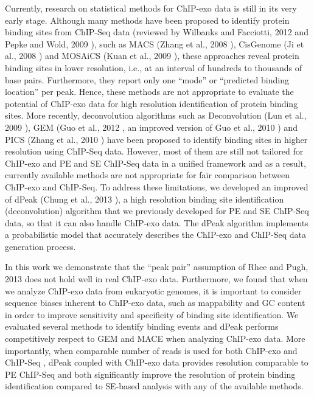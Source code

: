 \documentclass{bmcart}\usepackage[]{graphicx}\usepackage[]{color}
\begin{document}
Currently, research on statistical methods for ChIP-exo data is still
in its very early stage. Although many methods have been proposed to
identify protein binding sites from ChIP-Seq data (reviewed by
Wilbanks and Facciotti, 2012 \cite{evaluation} and Pepke and Wold,
2009 \cite{computation}), such as MACS (Zhang et al., 2008
\cite{macs}), CisGenome (Ji et al., 2008 \cite{cisgenome}) and MOSAiCS
(Kuan et al., 2009 \cite{mosaics}), these approaches reveal protein
binding sites in lower resolution, i.e., at an interval of hundreds to
thousands of base pairs. Furthermore, they report only one ``mode'' or
``predicted binding location'' per peak. Hence, these methods are not
appropriate to evaluate the potential of ChIP-exo data for high
resolution identification of protein binding sites. More recently,
deconvolution algorithms such as Deconvolution (Lun et al., 2009
\cite{csdeconv}), GEM (Guo et al., 2012 \cite{gem}, an improved
version of Guo et al., 2010 \cite{gps} ) and PICS (Zhang et al., 2010
\cite{pics}) have been proposed to identify binding sites in higher
resolution using ChIP-Seq data. However, most of them are still not
tailored for ChIP-exo and PE and SE ChIP-Seq data in a unified
framework and as a result, currently available methods are not
appropriate for fair comparison between ChIP-exo and ChIP-Seq. To
address these limitations, we developed an improved of dPeak (Chung et
al., 2013 \cite{dpeak}), a high resolution binding site identification
(deconvolution) algorithm that we previously developed for PE and SE
ChIP-Seq data, so that it can also handle ChIP-exo data. The dPeak
algorithm implements a probabilistic model that accurately describes
the ChIP-exo and ChIP-Seq data generation process.

In this work we demonstrate that the ``peak pair'' assumption of Rhee
and Pugh, 2013 \cite{exo2} does not hold well in real ChIP-exo
data. Furthermore, we found that when we analyze ChIP-exo data from
eukaryotic genomes, it is important to consider sequence biases
inherent to ChIP-exo data, such as mappability and GC content in order
to improve sensitivity and specificity of binding site
identification. We evaluated several methods to identify binding events
and dPeak performs competitively respect to GEM and MACE when
analyzing ChIP-exo data. More importantly, when comparable number of
reads is used for both ChIP-exo and ChIP-Seq , dPeak coupled with
ChIP-exo data provides resolution comparable to PE ChIP-Seq and both
significantly improve the resolution of protein binding identification
compared to SE-based analysis with any of the available methods.
\end{document}
